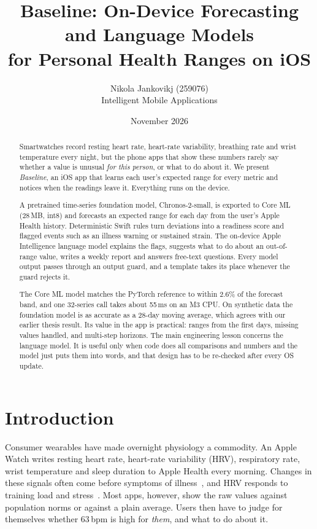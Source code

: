 \documentclass[11pt,a4paper]{article}
\title{Baseline: On-Device Forecasting and Language Models\\
for Personal Health Ranges on iOS}
\author{Nikola Jankovikj (259076)\\[2pt]\small Intelligent Mobile Applications}
\date{November 2026}
\begin{document}
\maketitle

\begin{abstract}
Smartwatches record resting heart rate, heart-rate variability, breathing rate and wrist temperature every night, but the phone apps that show these numbers rarely say whether a value is unusual \emph{for this person}, or what to do about it. We present \emph{Baseline}, an iOS app that learns each user's expected range for every metric and notices when the readings leave it. Everything runs on the device.

A pretrained time-series foundation model, Chronos-2-small, is exported to Core ML (28\,MB, int8) and forecasts an expected range for each day from the user's Apple Health history. Deterministic Swift rules turn deviations into a readiness score and flagged events such as an illness warning or sustained strain. The on-device Apple Intelligence language model explains the flags, suggests what to do about an out-of-range value, writes a weekly report and answers free-text questions. Every model output passes through an output guard, and a template takes its place whenever the guard rejects it.

The Core ML model matches the PyTorch reference to within 2.6\% of the forecast band, and one 32-series call takes about 55\,ms on an M3 CPU. On synthetic data the foundation model is as accurate as a 28-day moving average, which agrees with our earlier thesis result. Its value in the app is practical: ranges from the first days, missing values handled, and multi-step horizons. The main engineering lesson concerns the language model. It is useful only when code does all comparisons and numbers and the model just puts them into words, and that design has to be re-checked after every OS update.
\end{abstract}

\section{Introduction}

Consumer wearables have made overnight physiology a commodity. An Apple Watch writes resting heart rate, heart-rate variability (HRV), respiratory rate, wrist temperature and sleep duration to Apple Health every morning. Changes in these signals often come before symptoms of illness~\cite{mishra2020covid,radin2020influenza}, and HRV responds to training load and stress~\cite{shaffer2017hrv}. Most apps, however, show the raw values against population norms or against a plain average. Users then have to judge for themselves whether 63\,bpm is high for \emph{them}, and what to do about it.
\end{document}
